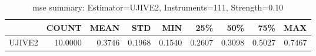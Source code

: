 \begin{table}[ht]
\centering
\caption{mse summary: Estimator=UJIVE2, Instruments=111, Strength=0.10}
\begin{tabular}{lrrrrrrrr}
\toprule
 & COUNT & MEAN & STD & MIN & 25\% & 50\% & 75\% & MAX \\
\midrule
UJIVE2 & 10.0000 & 0.3746 & 0.1968 & 0.1540 & 0.2607 & 0.3098 & 0.5027 & 0.7467 \\
\bottomrule
\end{tabular}
\end{table}
